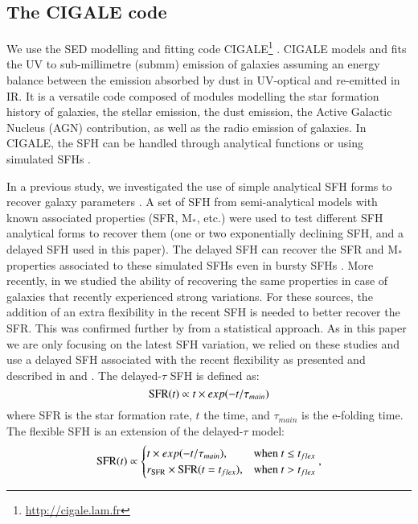 \documentclass[traditabstract]{aa} %
\begin{document}
\subsection{The CIGALE code}
We use the SED modelling and fitting code CIGALE\footnote{\url{http://cigale.lam.fr}} \citep{Boquien19}.
CIGALE models and fits the UV to sub-millimetre (submm) emission of galaxies assuming an energy balance between the emission absorbed by dust in UV-optical and re-emitted in IR.
It is a versatile code composed of modules modelling the star formation history of galaxies, the stellar emission, the dust emission, the Active Galactic Nucleus (AGN) contribution, as well as the radio emission of galaxies.
In CIGALE, the SFH can be handled through analytical functions or using simulated SFHs \citep{Boquien14,Ciesla15,Ciesla17}.

In a previous study, we investigated the use of simple analytical SFH forms to recover galaxy parameters \citep{Ciesla15}. 
A set of SFH from semi-analytical models with known associated properties (SFR, M$_*$, etc.) were used to test different SFH analytical forms to recover them (one or two exponentially declining SFH, and a delayed SFH used in this paper). 
The delayed SFH can recover the SFR and M$_*$ properties associated to these simulated SFHs even in bursty SFHs \citep[see for instance Fig. 7 of][]{Ciesla15}. 
More recently, in \cite{Ciesla17} we studied the ability of recovering the same properties in case of galaxies that recently experienced strong variations. 
For these sources, the addition of an extra flexibility in the recent SFH is needed to better recover the SFR. 
This was confirmed further by \cite{Aufort20} from a statistical approach. 
As in this paper we are only focusing on the latest SFH variation, we relied on these studies and use a delayed SFH associated with the recent flexibility as presented and described in \cite{Ciesla17} and \cite{Aufort20}.
The delayed-$\tau$ SFH is defined as:
\begin{equation}        
\mathrm{SFR}(t) \propto t \times exp(-t/\tau_{main})\\
\end{equation} 
\noindent where SFR is the star formation rate, $t$ the time, and $\tau_{main}$ is the e-folding time.
The flexible SFH is an extension of the delayed-$\tau$ model:
\begin{equation}        
\mathrm{SFR}(t) \propto
\begin{cases}
    t \times exp(-t/\tau_{main}), & \text{when}\ t\leq t_{flex} \\
    r_{\rm{SFR}} \times \mathrm{SFR}(t=t_{flex}), & \text{when}\ t>t_{flex} \\
\end{cases},
\end{equation}  
        
\end{document}
